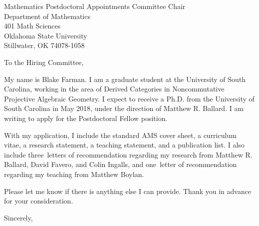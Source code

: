 \documentclass[12pt]{letter}
\date{\today}
\def\MSPRF{As requested in the posting, I have applied for an NSF Mathematical Sciences Postdoctoral Fellowship.
  If awarded, I plan to use it to carry out the proposed research laid out in my research statement at the University of Glasgow under the direction of Michael Wemyss.}
\def\position{Postdoctoral Fellow position}
\def\materials{the standard AMS cover sheet,
  a curriculum vitae,
  a research statement,
  a teaching statement,
  and a publication list}
\def\numresrefs{three}
\def\numteachrefs{one}
\def\refs{Matthew R. Ballard, David Favero, and Colin Ingalls}
\def\teachingrefs{Matthew Boylan}
\begin{document}
\begin{letter}{
    Mathematics Postdoctoral Appointments Committee Chair\\
    Department of Mathematics\\
    401 Math Sciences\\
    Oklahoma State University\\
    Stillwater, OK 74078-1058
  }
  \opening{To the Hiring Committee,}

  My name is Blake Farman.
  I am a graduate student at the University of South Carolina, working in the area of Derived Categories in Noncommutative Projective Algebraic Geometry.
  I expect to receive a Ph.D. from the University of South Carolina in May 2018, under the direction of Matthew R. Ballard.
  I am writing to apply for the \position.

  With my application, I include \materials.
  I also include \numresrefs\  letters of recommendation regarding my research from \refs, and \numteachrefs\ letter of recommendation regarding my teaching from \teachingrefs.

  
  Please let me know if there is anything else I can provide.
  Thank you in advance for your consideration.
  \closing{Sincerely,}
\end{letter}
\end{document}
